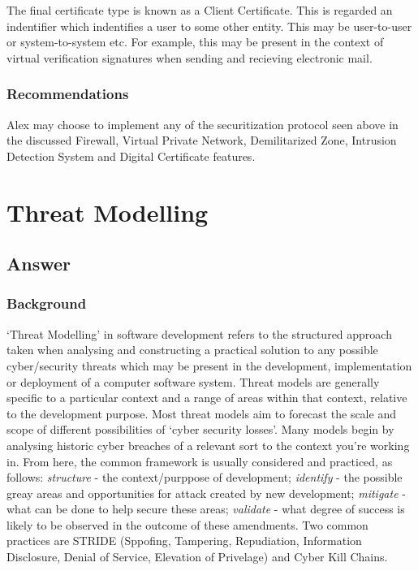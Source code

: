 \documentclass[11pt, english]{article}
\begin{document}
	The final certificate type is known as a Client Certificate. This is regarded an indentifier which indentifies a user to some other entity. This may be user-to-user or system-to-system etc. For example, this may be present in the context of virtual verification signatures when sending and recieving electronic mail.

		\subsubsection{Recommendations}

	Alex may choose to implement any of the securitization protocol seen above in the discussed Firewall, Virtual Private Network, Demilitarized Zone, Intrusion Detection System and Digital Certificate features.

\newpage

\section{Threat Modelling}

	\subsection{Answer}

		\subsubsection{Background}

	`Threat Modelling' in software development refers to the structured approach taken when analysing and constructing a practical solution to any possible cyber/security threats which may be present in the development, implementation or deployment of a computer software system. Threat models are generally specific to a particular context and a range of areas within that context, relative to the development purpose. Most threat models aim to forecast the scale and scope of different possibilities of `cyber security losses'. Many models begin by analysing historic cyber breaches of a relevant sort to the context you're working in. From here, the common framework is usually considered and practiced, as follows: \textit{structure} - the context/purppose of development; \textit{identify} - the possible greay areas and opportunities for attack created by new development; \textit{mitigate} - what can be done to help secure these areas; \textit{validate} - what degree of success is likely to be observed in the outcome of these amendments. Two common practices are STRIDE (Sppofing, Tampering, Repudiation, Information Disclosure, Denial of Service, Elevation of Privelage) and Cyber Kill Chains.
\end{document}
